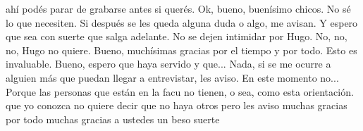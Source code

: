 \begin{description}[leftmargin=0cm, labelsep=0.5cm]
    \item[\textbf{JACUBOVICH LUCIANA:}] ahí podés parar de grabarse antes si querés. Ok, bueno, buenísimo chicos. No sé lo que necesiten. Si después se les queda alguna duda o algo, me avisan. Y espero que sea con suerte que salga adelante. No se dejen intimidar por Hugo. No, no, no, Hugo no quiere. Bueno, muchísimas gracias por el tiempo y por todo. Esto es invaluable. Bueno, espero que haya servido y que... Nada, si se me ocurre a alguien más que puedan llegar a entrevistar, les aviso. En este momento no... Porque las personas que están en la facu no tienen, o sea, como esta orientación. que yo conozca no quiere decir que no haya otros pero les aviso muchas gracias por todo muchas gracias a ustedes un beso suerte
\end{description}
